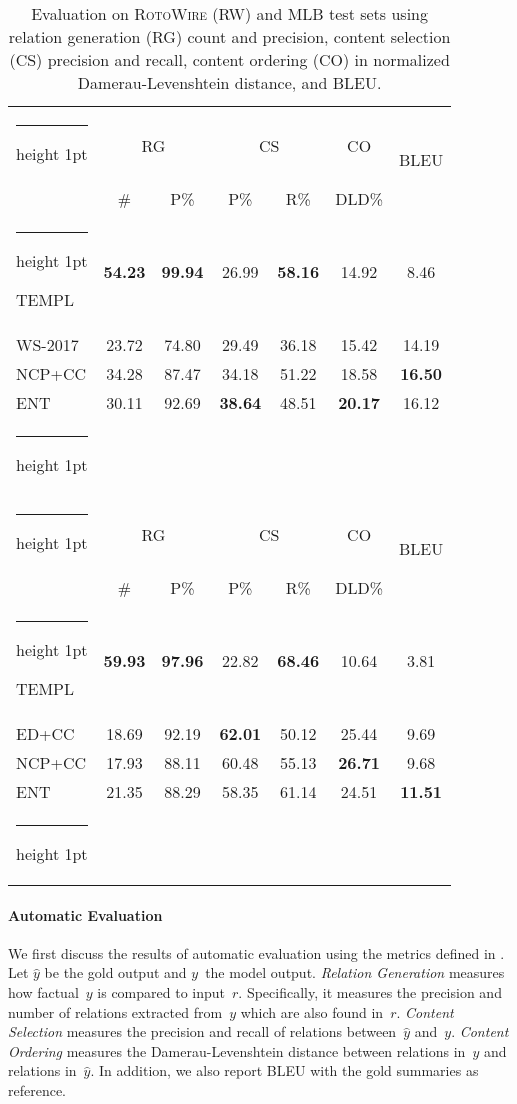 \documentclass[11pt,a4paper]{article}
\makeatletter
\newcommand{\thickhline}{\noalign {\ifnum 0=`}\fi \hrule height 1pt
    \futurelet \reserved@a \@xhline
}
\makeatother
\begin{document}
\begin{table}[t]
\small
\centering
\begin{tabular}{@{~}l@{~}|@{~}c@{~~~}c@{~}|c@{~~~}c|c|@{~}c@{~} } 
 \thickhline
 \multirow{2}{*}{\textsc{RW}} &\multicolumn{2}{c|}{RG} &\multicolumn{2}{c|}{CS} & CO & \multirow{2}{*}{BLEU}\\ 
 &\# & P\% & P\% & R\% & DLD\% & \\ \thickhline
TEMPL &\textbf{54.23} &\textbf{99.94} &26.99 &\textbf{58.16} &14.92 &\hspace*{1ex}8.46  \\
WS-2017 & 23.72 & 74.80 & 29.49 & 36.18 & 15.42 & 14.19 \\NCP+CC &{34.28} & {87.47} & 34.18 & {51.22}
 &18.58 & \textbf{16.50}\\ ENT&30.11 &92.69 & \textbf{38.64} & 48.51 & \textbf{20.17} & 16.12 \\
\thickhline
\multicolumn{7}{c}{} \\ \thickhline
 \multirow{2}{*}{MLB} &\multicolumn{2}{c|}{RG} &\multicolumn{2}{c|}{CS} & CO & \multirow{2}{*}{BLEU}\\

 &\# & P\% & P\% & R\% & DLD\% & \\ \thickhline
TEMPL & \textbf{59.93} & \textbf{97.96} & 22.82 & \textbf{68.46} & 10.64 & 3.81 \\
ED+CC & 18.69 & 92.19 & \textbf{62.01} & 50.12 & 25.44 & 9.69 \\
NCP+CC& 17.93 & 88.11 & 60.48 & 55.13 & \textbf{26.71} & 9.68 \\
ENT&21.35 & 88.29 & 58.35 & {61.14}
 &24.51 & \textbf{11.51}\\ \hline \thickhline
\end{tabular}
\caption{\label{tbl:mlb-with-ie-test}  Evaluation
  on  \textsc{RotoWire} (RW) and \textsc{MLB} test sets using 
  relation generation (RG)  count and precision, content
  selection (CS) precision and recall, content ordering (CO) in normalized
  Damerau-Levenshtein distance, and BLEU.} 
\end{table}



\paragraph{Automatic Evaluation}
We first discuss the results of automatic evaluation using the metrics
defined in .  Let $\hat{y}$ be the gold output and
$y$~the model output.  \emph{Relation Generation} measures how
factual~$y$ is compared to input~$r$. Specifically, it measures the
precision and number of relations extracted from~$y$ which are also
found in~$r$. \emph{Content Selection} measures the precision and
recall of relations between~$\hat{y}$ and~$y$. \emph{Content Ordering}
measures the Damerau-Levenshtein distance between relations in~$y$ and
relations in~$\hat{y}$. In addition, we also report BLEU
\cite{P02-1040} with the gold summaries as reference.
\end{document}
